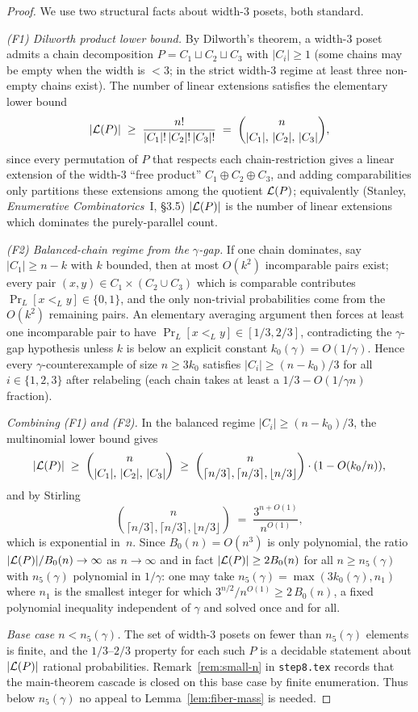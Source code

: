 \begin{proof}
We use two structural facts about width-$3$ posets, both standard.

\smallskip
\noindent\emph{(F1) Dilworth product lower bound.} By Dilworth's
theorem, a width-$3$ poset admits a chain decomposition
$P = C_1 \sqcup C_2 \sqcup C_3$ with $|C_i| \ge 1$ (some chains may
be empty when the width is $<3$; in the strict width-$3$ regime at
least three non-empty chains exist). The number of linear extensions
satisfies the elementary lower bound
\[
|\mathcal{L}(P)| \;\ge\; \frac{n!}{|C_1|!\,|C_2|!\,|C_3|!}
\;=\; \binom{n}{|C_1|,\,|C_2|,\,|C_3|},
\]
since every permutation of $P$ that respects each chain-restriction
gives a linear extension of the width-$3$ ``free product''
$C_1 \oplus C_2 \oplus C_3$, and adding comparabilities only
partitions these extensions among the quotient $\mathcal{L}(P)$; equivalently
(Stanley, \emph{Enumerative Combinatorics}~I, §3.5) $|\mathcal{L}(P)|$ is the
number of linear extensions which dominates the purely-parallel
count.

\smallskip
\noindent\emph{(F2) Balanced-chain regime from the $\gamma$-gap.}
If one chain dominates, say $|C_1| \ge n - k$ with $k$ bounded,
then at most $O(k^2)$ incomparable pairs exist; every pair
$(x,y) \in C_1 \times (C_2 \cup C_3)$ which is comparable contributes
$\Pr_L[x<_L y] \in \{0,1\}$, and the only non-trivial probabilities
come from the $O(k^2)$ remaining pairs. An elementary averaging
argument then forces at least one incomparable pair to have
$\Pr_L[x<_L y] \in [1/3, 2/3]$, contradicting the $\gamma$-gap
hypothesis unless $k$ is below an explicit constant
$k_0(\gamma) = O(1/\gamma)$. Hence every $\gamma$-counterexample of
size $n \ge 3k_0$ satisfies $|C_i| \ge (n - k_0)/3$ for all
$i \in \{1,2,3\}$ after relabeling (each chain takes at least a
$1/3 - O(1/\gamma n)$ fraction).

\smallskip
\noindent\emph{Combining (F1) and (F2).} In the balanced regime
$|C_i| \ge (n-k_0)/3$, the multinomial lower bound gives
\[
|\mathcal{L}(P)| \;\ge\; \binom{n}{|C_1|,\,|C_2|,\,|C_3|}
\;\ge\; \binom{n}{\lceil n/3\rceil,\lceil n/3\rceil,\lfloor n/3\rfloor}
\cdot (1 - O(k_0/n)),
\]
and by Stirling
\[
\binom{n}{\lceil n/3\rceil,\lceil n/3\rceil,\lfloor n/3\rfloor}
\;=\; \frac{3^{n+O(1)}}{n^{O(1)}},
\]
which is exponential in~$n$. Since $B_0(n) = O(n^3)$ is only
polynomial, the ratio $|\mathcal{L}(P)|/B_0(n) \to \infty$ as $n \to \infty$ and
in fact $|\mathcal{L}(P)| \ge 2 B_0(n)$ for all $n \ge n_5(\gamma)$ with
$n_5(\gamma)$ polynomial in $1/\gamma$: one may take $n_5(\gamma) =
\max(3k_0(\gamma), n_1)$ where $n_1$ is the smallest integer for
which $3^{n/2}/n^{O(1)} \ge 2\,B_0(n)$, a fixed polynomial inequality
independent of $\gamma$ and solved once and for all.

\smallskip
\noindent\emph{Base case $n < n_5(\gamma)$.} The set of width-$3$
posets on fewer than $n_5(\gamma)$ elements is finite, and the
$1/3$--$2/3$ property for each such $P$ is a decidable statement
about $|\mathcal{L}(P)|$ rational probabilities. Remark~\ref{rem:small-n} in
\texttt{step8.tex} records that the main-theorem cascade is closed
on this base case by finite enumeration. Thus below $n_5(\gamma)$
no appeal to Lemma~\ref{lem:fiber-mass} is needed.
\end{proof}

